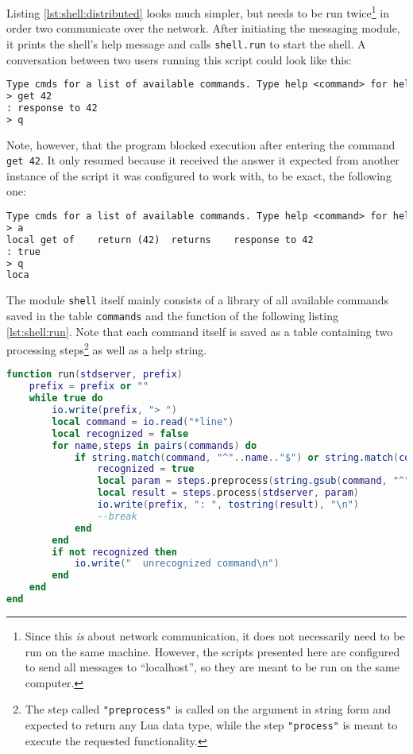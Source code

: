 \begin{appendices}
Listing \ref{lst:shell:distributed} looks much simpler, but needs to be run twice\footnote{Since this \emph{is} about network communication, it does not necessarily need to be run on the same machine. However, the scripts presented here are configured to send all messages to ``localhost'', so they are meant to be run on the same computer.} in order two communicate over the network. After initiating the messaging module, it prints the shell's help message and calls \texttt{shell.run} to start the shell. A conversation between two users running this script could look like this:

\begin{lstlisting}[language=tex, caption={A log from using the script of listing \ref{lst:shell:distributed}}, label=lst:shell:distributedlog1, name=lst:shell:disributedlog1]
  Type cmds for a list of available commands. Type help <command> for help.
> get 42
: response to 42
> q
\end{lstlisting}

Note, however, that the program blocked execution after entering the command \texttt{get 42}. It only resumed because it received the answer it expected from another instance of the script it was configured to work with, to be exact, the following one:

\begin{lstlisting}[language=tex, caption={Another log from using the script of listing \ref{lst:shell:distributed}}, label=lst:shell:distributedlog2, name=lst:shell:disributedlog2]
  Type cmds for a list of available commands. Type help <command> for help.
> a
local get of 	return (42)	 returns 	response to 42
: true
> q
loca
\end{lstlisting}

The module \texttt{shell} itself mainly consists of a library of all available commands saved in the table \texttt{commands} and the function of the following listing \ref{lst:shell:run}. Note that each command itself is saved as a table containing two processing steps\footnote{The step called \texttt{"preprocess"} is called on the argument in string form and expected to return any Lua data type, while the step \texttt{"process"} is meant to execute the requested functionality.} as well as a help string.

\begin{lstlisting}[language=lua, caption={The function \texttt{shell.run}}, label=lst:shell:run, name=lst:shell:run]
function run(stdserver, prefix)
	prefix = prefix or ""
	while true do
		io.write(prefix, "> ")
		local command = io.read("*line")
		local recognized = false
		for name,steps in pairs(commands) do
			if string.match(command, "^"..name.."$") or string.match(command, "^"..name.."%s") then
				recognized = true
				local param = steps.preprocess(string.gsub(command, "^"..name.."%s+(.*)$", "%1"))
				local result = steps.process(stdserver, param)
				io.write(prefix, ": ", tostring(result), "\n")
				--break
			end
		end
		if not recognized then
			io.write("  unrecognized command\n")
		end
	end
end
\end{lstlisting}


\end{appendices}
